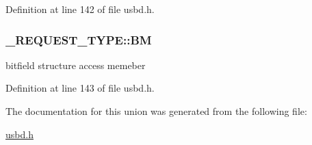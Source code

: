 Definition at line 142 of file usbd.\+h.

\subsubsection[{\texorpdfstring{BM}{BM}}]{ \+\_\+\+R\+E\+Q\+U\+E\+S\+T\+\_\+\+T\+Y\+P\+E\+::\+BM}\hypertarget{union__REQUEST__TYPE_aeb4f47d17f203fbb11ffd16c454dde0c}{}\label{union__REQUEST__TYPE_aeb4f47d17f203fbb11ffd16c454dde0c}
bitfield structure access memeber 

Definition at line 143 of file usbd.\+h.



The documentation for this union was generated from the following file\+:\begin{DoxyCompactItemize}
\item 
\hyperlink{usbd_8h}{usbd.\+h}\end{DoxyCompactItemize}
